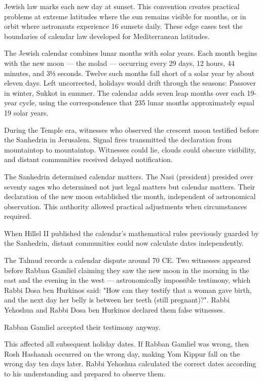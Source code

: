 Jewish law marks each new day at sunset. This convention creates practical problems at extreme latitudes where the sun remains visible for months, or in orbit where astronauts experience 16 sunsets daily. These edge cases test the boundaries of calendar law developed for Mediterranean latitudes.

The Jewish calendar combines lunar months with solar years. Each month begins with the new moon — the molad — occurring every 29 days, 12 hours, 44 minutes, and 3⅓ seconds. Twelve such months fall short of a solar year by about eleven days. Left uncorrected, holidays would drift through the seasons: Passover in winter, Sukkot in summer. The calendar adds seven leap months over each 19-year cycle, using the correspondence that 235 lunar months approximately equal 19 solar years.

During the Temple era, witnesses who observed the crescent moon testified before the Sanhedrin in Jerusalem. Signal fires transmitted the declaration from mountaintop to mountaintop. Witnesses could lie, clouds could obscure visibility, and distant communities received delayed notification.

The Sanhedrin determined calendar matters. The Nasi (president) presided over seventy sages who determined not just legal matters but calendar matters. Their declaration of the new moon established the month, independent of astronomical observation. This authority allowed practical adjustments when circumstances required.

When Hillel II published the calendar's mathematical rules previously guarded by the Sanhedrin, distant communities could now calculate dates independently. 

The Talmud records a calendar dispute around 70 CE. Two witnesses appeared before Rabban Gamliel claiming they saw the new moon in the morning in the east and the evening in the west — astronomically impossible testimony, which Rabbi Dosa ben Hurkinos said: "How can they testify that a woman gave birth, and the next day her belly is between her teeth (still pregnant)?". Rabbi Yehoshua and Rabbi Dosa ben Hurkinos declared them false witnesses.

Rabban Gamliel accepted their testimony anyway.

This affected all subsequent holiday dates. If Rabban Gamliel was wrong, then Rosh Hashanah occurred on the wrong day, making Yom Kippur fall on the wrong day ten days later. Rabbi Yehoshua calculated the correct dates according to his understanding and prepared to observe them.

